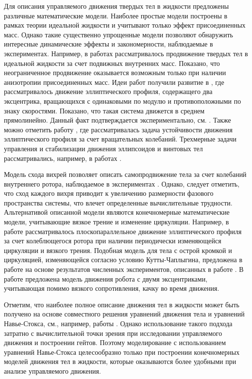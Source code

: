 Для описания управляемого движения твердых тел в жидкости предложены различные математические модели. Наиболее простые модели построены в рамках теории идеальной жидкости и учитывают только эффект присоединенных масс. Однако такие существенно упрощенные модели позволяют обнаружить интересные динамические эффекты и закономерности, наблюдаемые в экспериментах. Например, в работах \cite{Kozlov_Ramodanov_PMM_2001, Kozlov_Onichenko} рассматривалось продвижение твердых тел в идеальной жидкости за счет подвижных внутренних масс. Показано, что неограниченное продвижение оказывается возможным только при наличии анизотропии присоединенных масс. Идеи работ \cite{Kozlov_Ramodanov_PMM_2001, Kozlov_Onichenko} получили развитие в \cite{Vetchanin_Kilin_2016}, где рассматривалось движение эллиптического профиля, содержащего два эксцентрика, вращающихся с одинаковыми по модулю и противоположными по знаку скоростями. Показано, что такая система движется в среднем прямолинейно. Данный факт подтверждается экспериментально, см. \cite{Klenov_Kilin_2016}. Также можно отметить работу \cite{Jing_Kanso_2013}, где рассматривалась задача устойчивости движения эллиптического профиля за счет вращательных колебаний. Трехмерные задачи управления и стабилизации движения эллипсоидов и винтовых тел рассматривались, например, в работах \cite{Borisov_et_al_2017, Vetchanin_Mamaev_2017, Vetchanin_et_al_2016, Woolsey_Leonard_1999}.

Модель схода вихрей позволяет описать самопродвижение тела за счет колебаний внутреннего ротора, наблюдаемое в экспериментах \cite{Tallapragada_2015, Pollard_Tallapragada_2019}. Однако, следует отметить, что сход каждого вихря приводит к увеличению размерности фазового пространства системы, что влечет определенные вычислительные трудности. Альтернативой описанной модели являются конечномерные математические модели, учитывающие вязкое трение и изменение циркуляции. Например, в работе \cite{Borisov_et_al_2018} рассматривалось плоскопараллельное движение эллиптического профиля за счет колеблющегося ротора при наличии периодически изменяющейся циркуляции и вязкого трения. Подобная модель для тела с острой кромкой и циркуляцией, изменяющейся согласно условию Кутты-Чаплыгина, предложена в работе \cite{Mamaev_Vetchanin_2018} на основе результатов численных экспериментов, описанных в работе \cite{Mamaev_et_al_2018}. В работе \cite{Kilin_et_al_2018} предложена модель движения робота с двумя эксцентриками, учитывающая помимо вязкого сопротивления, качку во время движения.

Отметим, что наиболее полное описание движения тел в жидкости может быть получено на основе совместного решения уравнений движения тела и уравнений Навье-Стокса, см., например, работы \cite{Childress_et_al_2011, Eldredge_2006, Vetchanin_et_al_2013}. Однако использование такого подхода затратно с вычислительной точки зрения при исследовании управляемого движения и построении гейтов. Поэтому моделирование с использованием уравнений Навье-Стокса целесообразно только при построении конечномерных моделей движения тел в жидкости, которые оказываются более удобными при анализе управляемого движения.

